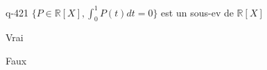 \begin{truefalse}{q-421}
$\{ P \in \mathbb R[X], \int_0^1 P(t)dt=0\}$ est un sous-ev de $\mathbb R[X]$
\item* Vrai
\item Faux
\end{truefalse}


